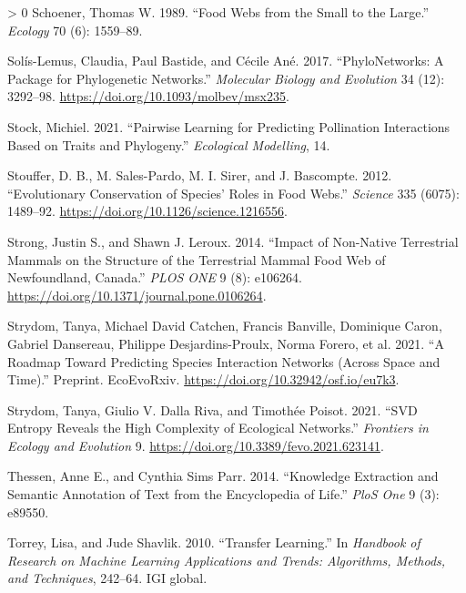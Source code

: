 \documentclass[10pt,oneside]{article}
\newlength{\cslhangindent}
\newenvironment{CSLReferences}[3] %
 {%
  \setlength{\parindent}{0pt}
  \ifodd #1 \everypar{\setlength{\hangindent}{\cslhangindent}}\ignorespaces\fi
  \ifnum #2 > 0
  \setlength{\parskip}{#2\baselineskip}
  \fi
 }%
 {}
\begin{document}
\begin{CSLReferences}{1}{0}
\leavevmode\hypertarget{ref-Schoener1989FooWeb}{}%
Schoener, Thomas W. 1989. {``Food Webs from the Small to the Large.''}
\emph{Ecology} 70 (6): 1559--89.

\leavevmode\hypertarget{ref-Solis-Lemus2017PhyPac}{}%
Solís-Lemus, Claudia, Paul Bastide, and Cécile Ané. 2017.
{``PhyloNetworks: A Package for Phylogenetic Networks.''}
\emph{Molecular Biology and Evolution} 34 (12): 3292--98.
\url{https://doi.org/10.1093/molbev/msx235}.

\leavevmode\hypertarget{ref-Stock2021PaiLea}{}%
Stock, Michiel. 2021. {``Pairwise Learning for Predicting Pollination
Interactions Based on Traits and Phylogeny.''} \emph{Ecological
Modelling}, 14.

\leavevmode\hypertarget{ref-Stouffer2012EvoCon}{}%
Stouffer, D. B., M. Sales-Pardo, M. I. Sirer, and J. Bascompte. 2012.
{``Evolutionary Conservation of Species' Roles in Food Webs.''}
\emph{Science} 335 (6075): 1489--92.
\url{https://doi.org/10.1126/science.1216556}.

\leavevmode\hypertarget{ref-Strong2014ImpNon}{}%
Strong, Justin S., and Shawn J. Leroux. 2014. {``Impact of Non-Native
Terrestrial Mammals on the Structure of the Terrestrial Mammal Food Web
of Newfoundland, Canada.''} \emph{PLOS ONE} 9 (8): e106264.
\url{https://doi.org/10.1371/journal.pone.0106264}.

\leavevmode\hypertarget{ref-Strydom2021RoaPre}{}%
Strydom, Tanya, Michael David Catchen, Francis Banville, Dominique
Caron, Gabriel Dansereau, Philippe Desjardins-Proulx, Norma Forero, et
al. 2021. {``A Roadmap Toward Predicting Species Interaction Networks
(Across Space and Time).''} Preprint. EcoEvoRxiv.
\url{https://doi.org/10.32942/osf.io/eu7k3}.

\leavevmode\hypertarget{ref-Strydom2021SvdEnt}{}%
Strydom, Tanya, Giulio V. Dalla Riva, and Timothée Poisot. 2021. {``SVD
Entropy Reveals the High Complexity of Ecological Networks.''}
\emph{Frontiers in Ecology and Evolution} 9.
\url{https://doi.org/10.3389/fevo.2021.623141}.

\leavevmode\hypertarget{ref-Thessen2014KnoExt}{}%
Thessen, Anne E., and Cynthia Sims Parr. 2014. {``Knowledge Extraction
and Semantic Annotation of Text from the Encyclopedia of Life.''}
\emph{PloS One} 9 (3): e89550.

\leavevmode\hypertarget{ref-Torrey2010TraLea}{}%
Torrey, Lisa, and Jude Shavlik. 2010. {``Transfer Learning.''} In
\emph{Handbook of Research on Machine Learning Applications and Trends:
Algorithms, Methods, and Techniques}, 242--64. IGI global.


\end{CSLReferences}
\end{document}
